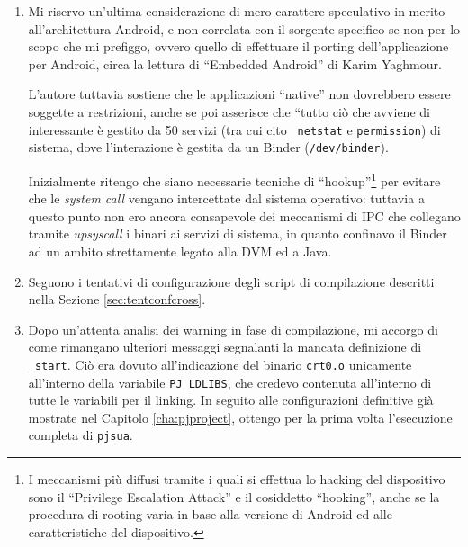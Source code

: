 \begin{enumerate}
\item Mi riservo un'ultima considerazione di mero carattere speculativo in
	merito all'architettura Android, e non correlata con il sorgente specifico
	se non per lo scopo che mi prefiggo, ovvero quello di effettuare il porting
	dell'applicazione per Android, circa la lettura di ``Embedded Android''
	di Karim Yaghmour.
	
	L'autore tuttavia sostiene che le applicazioni ``native'' non dovrebbero
	essere soggette a restrizioni, anche se poi asserisce che ``tutto ciò che
	avviene di interessante è gestito da 50 servizi (tra cui cito \texttt{\small
	netstat} e \texttt{\small permission}) di sistema, dove l'interazione è gestita da un Binder
	(\texttt{\small /dev/binder}).
	
	Inizialmente ritengo che siano necessarie tecniche di ``hookup''\footnote{I meccanismi più diffusi tramite i quali 
       si effettua lo hacking del dispositivo sono il ``Privilege Escalation
       Attack'' e il cosiddetto ``hooking'', anche se la procedura di rooting
       varia in base alla versione di Android ed alle caratteristiche del 
       dispositivo.} per 
	evitare che le \textit{system call} vengano intercettate dal sistema operativo:
	tuttavia a questo punto non ero ancora consapevole dei meccanismi di IPC
	che collegano tramite \textit{upsyscall} i binari ai servizi di sistema, in
	quanto confinavo il Binder ad un ambito strettamente legato alla DVM ed
	a Java.
\item Seguono i tentativi di configurazione degli script di compilazione 
	descritti nella Sezione \vref{sec:tentconfcross}.
\item Dopo un'attenta analisi dei warning in fase di compilazione, mi accorgo
	di come rimangano ulteriori messaggi segnalanti la mancata definizione di
	\texttt{\small \_start}. Ciò era  dovuto all'indicazione del binario 
	\texttt{\small crt0.o} unicamente all'interno della variabile \texttt{\small PJ\_LDLIBS},
	che credevo  contenuta all'interno di tutte le variabili per il 
	linking.
	In seguito alle configurazioni definitive già mostrate
	nel Capitolo \vref{cha:pjproject}, ottengo per la prima volta l'esecuzione
	completa di \texttt{\small pjsua}.
\end{enumerate}



